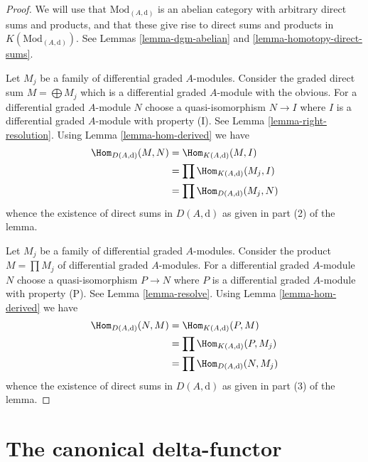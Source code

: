\begin{proof}
We will use that $\text{Mod}_{(A, \text{d})}$ is an abelian category
with arbitrary direct sums and products, and that these give rise
to direct sums and products in $K(\text{Mod}_{(A, \text{d})})$.
See Lemmas \ref{lemma-dgm-abelian} and \ref{lemma-homotopy-direct-sums}.

\medskip\noindent
Let $M_j$ be a family of differential graded $A$-modules.
Consider the graded direct sum $M = \bigoplus M_j$ which is a
differential graded $A$-module with the obvious.
For a differential graded $A$-module $N$ choose a quasi-isomorphism
$N \to I$ where $I$ is a differential graded $A$-module with property (I).
See Lemma \ref{lemma-right-resolution}.
Using Lemma \ref{lemma-hom-derived} we have
\begin{align*}
\Hom_{D(A, \text{d})}(M, N)
& =
\Hom_{K(A, \text{d})}(M, I) \\
& =
\prod \Hom_{K(A, \text{d})}(M_j, I) \\
& =
\prod \Hom_{D(A, \text{d})}(M_j, N)
\end{align*}
whence the existence of direct sums in $D(A, \text{d})$ as given in
part (2) of the lemma.

\medskip\noindent
Let $M_j$ be a family of differential graded $A$-modules.
Consider the product $M = \prod M_j$ of differential graded $A$-modules.
For a differential graded $A$-module $N$ choose a quasi-isomorphism
$P \to N$ where $P$ is a differential graded $A$-module with property (P).
See Lemma \ref{lemma-resolve}.
Using Lemma \ref{lemma-hom-derived} we have
\begin{align*}
\Hom_{D(A, \text{d})}(N, M)
& =
\Hom_{K(A, \text{d})}(P, M) \\
& =
\prod \Hom_{K(A, \text{d})}(P, M_j) \\
& =
\prod \Hom_{D(A, \text{d})}(N, M_j)
\end{align*}
whence the existence of direct sums in $D(A, \text{d})$ as given in
part (3) of the lemma.
\end{proof}







\section{The canonical delta-functor}
\label{section-canonical-delta-functor}

